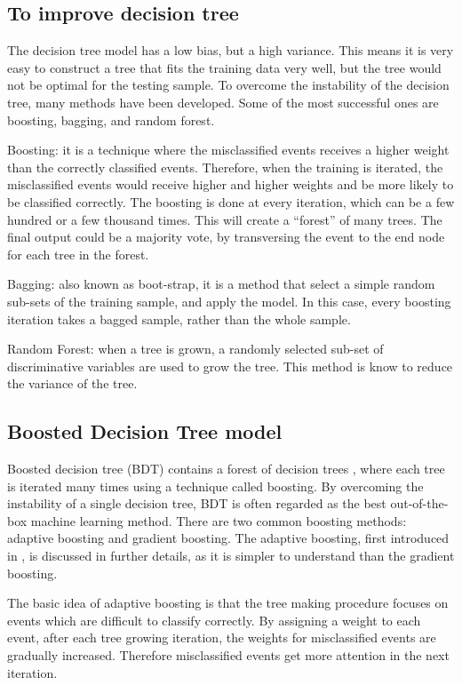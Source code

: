 \subsection{To improve decision tree}

The decision tree model has a low bias, but a high variance. This means it is very easy to construct a tree that fits the training data very well, but the tree would not be optimal for the testing sample. To overcome the instability of the decision tree, many methods have been developed. Some of the most successful ones are boosting, bagging, and random forest.

Boosting: it is a technique where the misclassified events receives a higher weight than the correctly classified events. Therefore, when the training is iterated, the misclassified events would receive higher and higher weights and be more likely to be classified correctly. The boosting is done at every iteration, which can be a few hundred or a few thousand times. This will create a ``forest'' of many trees. The final output could be a majority vote, by transversing the event to the end node for each tree in the forest.

Bagging: also known as boot-strap, it is a method that select a simple random sub-sets of the training sample, and apply the model. In this case, every boosting iteration takes a bagged sample, rather than the whole sample.

Random Forest: when a tree is grown, a randomly selected sub-set of discriminative variables are used to grow the tree. This method is know to reduce the variance of the tree.

\subsection{Boosted Decision Tree model}
\label{sec:analysisBDT}

Boosted decision tree (BDT) contains a forest of decision trees , where each tree is iterated many times using a technique called boosting.   By overcoming the instability of a single  decision tree, BDT is often regarded as  the best out-of-the-box machine learning method. There are two common boosting methods: adaptive boosting and gradient boosting. The adaptive boosting,  first introduced in \cite{FREUND1997119}, is discussed in further details, as it is simpler to understand than the gradient boosting.

The basic idea of adaptive boosting is that the tree making procedure focuses on events which are difficult to classify correctly. By assigning a weight to each event,   after each tree growing iteration, the weights for misclassified events are gradually increased. Therefore misclassified events get more attention in the next iteration.



